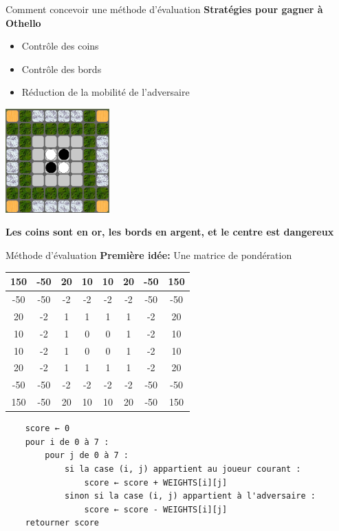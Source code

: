 \begin{frame}[t]{Comment concevoir une méthode d'évaluation}
    \textbf{Stratégies pour gagner à Othello}
    \begin{itemize}
        \item Contrôle des coins 
        \item Contrôle des bords 
        \item Réduction de la mobilité de l'adversaire
    \end{itemize}
    \begin{center}
        \includegraphics[width=0.3\textwidth]{img/eval_0.png}
    \end{center}
    \textbf{Les coins sont en or, les bords en argent, et le centre est dangereux}
\end{frame}

\begin{frame}[t,fragile]{Méthode d'évaluation}
    \textbf{Première idée:}
    Une matrice de pondération
    \begin{table}[h!]
    \centering
    \begin{tabular}{|c|c|c|c|c|c|c|c|}
    \hline
    150 & -50 & 20 & 10 & 10 & 20 & -50 & 150 \\ \hline
    -50 & -50 & -2 & -2 & -2 & -2 & -50 & -50 \\ \hline
    20 & -2 & 1 & 1 & 1 & 1 & -2 & 20 \\ \hline
    10 & -2 & 1 & 0 & 0 & 1 & -2 & 10 \\ \hline
    10 & -2 & 1 & 0 & 0 & 1 & -2 & 10 \\ \hline
    20 & -2 & 1 & 1 & 1 & 1 & -2 & 20 \\ \hline
    -50 & -50 & -2 & -2 & -2 & -2 & -50 & -50 \\ \hline
    150 & -50 & 20 & 10 & 10 & 20 & -50 & 150 \\ \hline
    \end{tabular}
    \end{table}
    {\footnotesize
    \begin{verbatim}
    score ← 0
    pour i de 0 à 7 :
        pour j de 0 à 7 :
            si la case (i, j) appartient au joueur courant :
                score ← score + WEIGHTS[i][j]
            sinon si la case (i, j) appartient à l'adversaire :
                score ← score - WEIGHTS[i][j]
    retourner score
    \end{verbatim}
    }
\end{frame}

